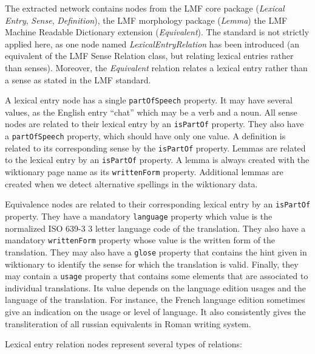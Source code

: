 \documentclass[10pt, a4paper]{article}
\begin{document}
The extracted network contains nodes from the LMF core package (\emph{Lexical Entry}, \emph{Sense}, \emph{Definition}), the LMF morphology package (\emph{Lemma}) the LMF Machine Readable Dictionary extension (\emph{Equivalent}). The standard is not strictly applied here, as one node named \emph{LexicalEntryRelation} has been introduced (an equivalent of the LMF Sense Relation class, but relating lexical entries rather than senses). Moreover, the \emph{Equivalent} relation relates a lexical entry rather than a sense as stated in the LMF standard.

A lexical entry node has a single \texttt{partOfSpeech} property. It may have several values, as the English entry ``chat'' which may be a verb and a noun. All sense nodes are related to their lexical entry by an \texttt{isPartOf} property. They also have a \texttt{partOfSpeech} property, which should have only one value. A definition is related to its corresponding sense by the \texttt{isPartOf} property. Lemmas are related to the lexical entry by an \texttt{isPartOf} property. A lemma is always created with the wiktionary page name as its \texttt{writtenForm} property. Additional lemmas are created when we detect alternative spellings in the wiktionary data.

Equivalence nodes are related to their corresponding lexical entry by an \texttt{isPartOf} property. They have a mandatory \texttt{language} property which value is the normalized ISO 639-3 3 letter language code \cite{ISO639-3:2007} of the translation. They also have a mandatory \texttt{writtenForm} property whose value is the written form of the translation. They may also have a \texttt{glose} property that contains the hint given in wiktionary to identify the sense for which the translation is valid. Finally, they may contain a \texttt{usage} property that contains some elements that are associated to individual translations. Its value depends on the language edition usages and the language of the translation. For instance, the French language edition sometimes give an indication on the usage or level of language. It also consistently gives the transliteration of all russian equivalents in Roman writing system.

Lexical entry relation nodes represent several types of relations:
\end{document}
